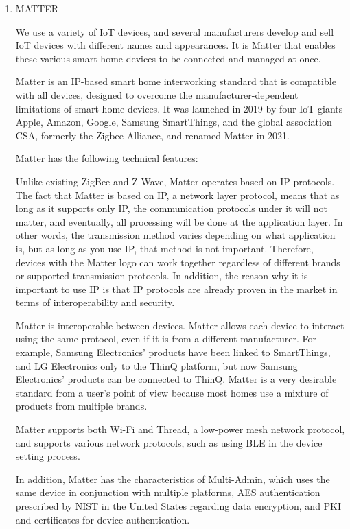 \documentclass[conference]{IEEEtran}
\begin{document}
\begin{enumerate}[itemsep=2ex, parsep=1ex]
    \item MATTER
    
    We use a variety of IoT devices, and several manufacturers develop and sell IoT devices with different names and appearances. It is Matter that enables these various smart home devices to be connected and managed at once.
    
    Matter is an IP-based smart home interworking standard that is compatible with all devices, designed to overcome the manufacturer-dependent limitations of smart home devices. It was launched in 2019 by four IoT giants Apple, Amazon, Google, Samsung SmartThings, and the global association CSA, formerly the Zigbee Alliance, and renamed Matter in 2021.
    
    Matter has the following technical features:
    
    Unlike existing ZigBee and Z-Wave, Matter operates based on IP protocols. The fact that Matter is based on IP, a network layer protocol, means that as long as it supports only IP, the communication protocols under it will not matter, and eventually, all processing will be done at the application layer. In other words, the transmission method varies depending on what application is, but as long as you use IP, that method is not important. Therefore, devices with the Matter logo can work together regardless of different brands or supported transmission protocols. In addition, the reason why it is important to use IP is that IP protocols are already proven in the market in terms of interoperability and security.
    
    Matter is interoperable between devices. Matter allows each device to interact using the same protocol, even if it is from a different manufacturer. For example, Samsung Electronics' products have been linked to SmartThings, and LG Electronics only to the ThinQ platform, but now Samsung Electronics' products can be connected to ThinQ. Matter is a very desirable standard from a user's point of view because most homes use a mixture of products from multiple brands.
    
    Matter supports both Wi-Fi and Thread, a low-power mesh network protocol, and supports various network protocols, such as using BLE in the device setting process.
    
    In addition, Matter has the characteristics of Multi-Admin, which uses the same device in conjunction with multiple platforms, AES authentication prescribed by NIST in the United States regarding data encryption, and PKI and certificates for device authentication.
    

\end{enumerate}
\end{document}
